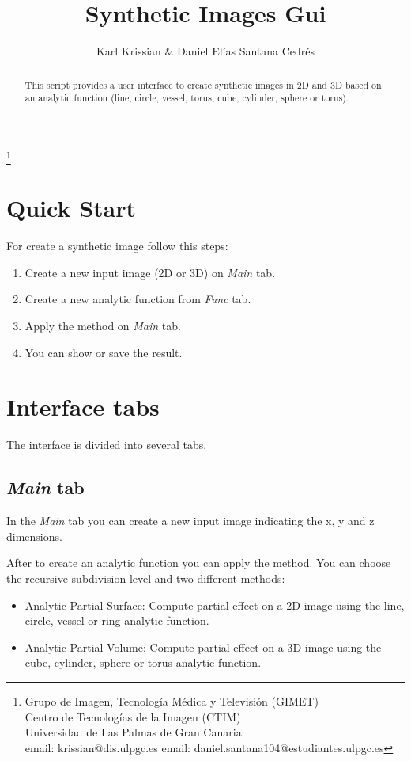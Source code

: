 \documentclass{article}
\begin{document}
\title{Synthetic Images Gui}
\author{Karl Krissian \& Daniel El\'ias Santana Cedr\'es}
\thanks{
Grupo de Imagen, Tecnolog\'ia M\'edica y Televisi\'on (GIMET)\\
Centro de Tecnolog\'ias de la Imagen (CTIM)\\
Universidad de Las Palmas de Gran Canaria\\
email: krissian@dis.ulpgc.es
email: daniel.santana104@estudiantes.ulpgc.es
}


\maketitle

\begin{abstract}
This script provides a user interface to create synthetic images in 2D and 3D based on an analytic function (line, circle, vessel, torus, cube, cylinder, sphere or torus).
\end{abstract}


\section{Quick Start}

For create a synthetic image follow this steps:
\begin{enumerate}
  \item Create a new input image (2D or 3D) on \emph{Main} tab.
  \item Create a new analytic function from \emph{Func} tab.
  \item Apply the method on \emph{Main} tab.
  \item You can show or save the result.
\end{enumerate}

\section{Interface tabs}

The interface is divided into several tabs.

\subsection{\emph{Main} tab}
In the \emph{Main} tab you can create a new input image indicating the x, y and z dimensions.

After to create an analytic function you can apply the method. You can choose the recursive subdivision level and two different methods:
\begin{itemize}
	\item Analytic Partial Surface: Compute partial effect on a 2D image using the line, circle, vessel or ring analytic function.
	\item Analytic Partial Volume: Compute partial effect on a 3D image using the cube, cylinder, sphere or torus analytic function.
\end{itemize}
\end{document}
